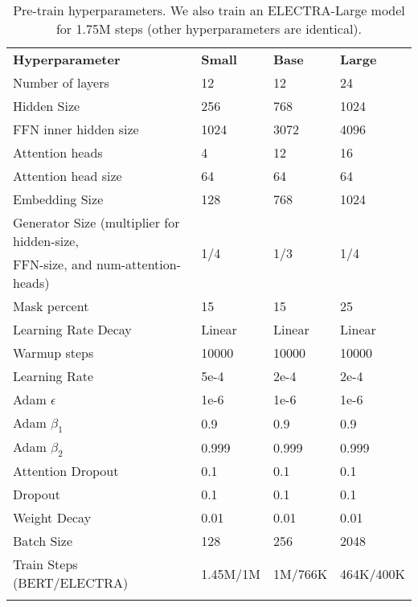 \documentclass{article}
\newcommand\tstrut{\rule{0pt}{2.6ex}}
\newcommand\bstrut{\rule[-1.0ex]{0pt}{0pt}}
\newcommand{\thinline}{\Xhline{1.5\arrayrulewidth}}
\newcommand{\thickline}{\Xhline{2.5\arrayrulewidth}}
\newcommand{\tsep}	{\bstrut \\ \thinline}
\newcommand{\ttop}{\thickline}
\newcommand{\tbottom}{\bstrut \\ \thickline}
\begin{document}
\addtolength{\tabcolsep}{0pt}
\begin{table*}[t!]
\begin{center}
\begin{tabularx}{0.9\linewidth}{X l l l}
\ttop
\textbf{Hyperparameter} & \textbf{Small} & \textbf{Base} & \textbf{Large} \tstrut \tsep
Number of layers & 12 & 12 & 24 \tstrut \\
Hidden Size & 256 & 768 & 1024 \\
FFN inner hidden size & 1024 & 3072 & 4096 \\
Attention heads & 4 & 12 & 16 \\
Attention head size & 64 & 64 & 64 \\
Embedding Size & 128 & 768 & 1024 \\
Generator Size (multiplier for hidden-size, & \multirow{2}{*}{1/4} & \multirow{2}{*}{1/3} & \multirow{2}{*}{1/4} \\
FFN-size, and num-attention-heads) & & & \\
Mask percent & 15 & 15 & 25 \\
Learning Rate Decay & Linear & Linear & Linear \\
Warmup steps & 10000 & 10000 & 10000 \\
Learning Rate & 5e-4 & 2e-4 & 2e-4 \\
Adam $\epsilon$ & 1e-6 & 1e-6 & 1e-6 \\
Adam $\beta_1$ & 0.9 & 0.9 & 0.9 \\
Adam $\beta_2$ & 0.999 & 0.999 & 0.999 \\
Attention Dropout & 0.1 & 0.1 & 0.1 \\
Dropout & 0.1 & 0.1 & 0.1 \\
Weight Decay & 0.01 & 0.01 & 0.01 \\
Batch Size & 128 & 256 & 2048 \\
Train Steps (BERT/ELECTRA) & 1.45M/1M & 1M/766K & 464K/400K \tbottom
\end{tabularx} 
\end{center}
\caption{Pre-train hyperparameters. We also train an ELECTRA-Large model for 1.75M steps (other hyperparameters are identical).}
\label{tab:hyperpre}
\end{table*}
\addtolength{\tabcolsep}{0pt}
\end{document}
